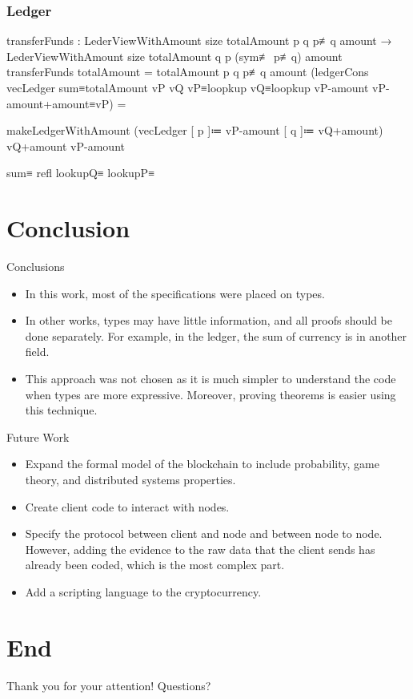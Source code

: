 \documentclass{beamer}
\begin{document}
\begin{frame}
  \frametitle{Ledger}
\begin{code}
transferFunds :
    LederViewWithAmount size totalAmount p q
      p≢q amount
  → LederViewWithAmount size totalAmount q p
      (sym≢ p≢q) amount
transferFunds {totalAmount = totalAmount} {p} {q}
  {p≢q} {amount}
  (ledgerCons vecLedger sum≡totalAmount vP vQ vP≡loopkup
    vQ≡loopkup vP-amount vP-amount+amount≡vP) =

    makeLedgerWithAmount
      (vecLedger [ p ]≔ vP-amount [ q ]≔ vQ+amount)
      vQ+amount vP-amount

      sum≡ refl lookupQ≡ lookupP≡
\end{code}
\end{frame}

\section{Conclusion}

\begin{frame}{Conclusions}
  \begin{itemize}[<+->]
    \item In this work, most of the specifications were placed on types.
    \item In other works, types may have little information, and all proofs should be done separately.
      For example, in the ledger, the sum of currency is in another field.
    \item This approach was not chosen as it is much simpler to understand the code when types are more expressive.
      Moreover, proving theorems is easier using this technique.
  \end{itemize}
\end{frame}

\begin{frame}{Future Work}
  \begin{itemize}[<+->]
    \item Expand the formal model of the blockchain to include
      probability, game theory, and distributed systems properties.
    \item Create client code to interact with nodes.
    \item Specify the protocol between client and node and between node to node.
          However, adding the evidence to the raw data that the client sends has already been coded,
          which is the most complex part.
    \item Add a scripting language to the cryptocurrency.
  \end{itemize}
\end{frame}

\section{End}

\begin{frame}
  \vspace*{36 pt}
  \begin{center}
  {\Huge Thank you for your attention!}
  {\Huge Questions?}
  \end{center}
\end{frame}

%   
%   
\end{document}
